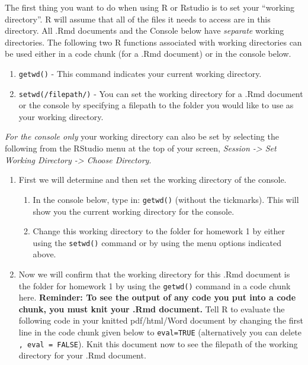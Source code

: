 \documentclass[]{article}
\begin{document}
The first thing you want to do when using R or Rstudio is to set your
``working directory''. R will assume that all of the files it needs to
access are in this directory. All .Rmd documents and the Console below
have \emph{separate} working directories. The following two R functions
associated with working directories can be used either in a code chunk
(for a .Rmd document) or in the console below.

\begin{enumerate}
\def\labelenumi{\arabic{enumi})}
\item
  \texttt{getwd()} - This command indicates your current working
  directory.
\item
  \texttt{setwd(\textquotesingle{}/filepath/\textquotesingle{})} - You
  can set the working directory for a .Rmd document or the console by
  specifying a filepath to the folder you would like to use as your
  working directory.
\end{enumerate}

\emph{For the console only} your working directory can also be set by
selecting the following from the RStudio menu at the top of your screen,
\emph{Session -\textgreater{} Set Working Directory -\textgreater{}
Choose Directory}.

\begin{enumerate}
\def\labelenumi{\arabic{enumi}.}
\item
  First we will determine and then set the working directory of the
  console.

  \begin{enumerate}
  \def\labelenumii{\alph{enumii}.}
  \item
    In the console below, type in: \texttt{getwd()} (without the
    tickmarks). This will show you the current working directory for the
    console.
  \item
    Change this working directory to the folder for homework 1 by either
    using the \texttt{setwd()} command or by using the menu options
    indicated above.
  \end{enumerate}
\item
  Now we will confirm that the working directory for this .Rmd document
  is the folder for homework 1 by using the \texttt{getwd()} command in
  a code chunk here. \textbf{Reminder: To see the output of any code you
  put into a code chunk, you must knit your .Rmd document.} Tell R to
  evaluate the following code in your knitted pdf/html/Word document by
  changing the first line in the code chunk given below to
  \texttt{eval=TRUE} (alternatively you can delete
  \texttt{,\ eval\ =\ FALSE}). Knit this document now to see the
  filepath of the working directory for your .Rmd document.
\end{enumerate}
\end{document}
